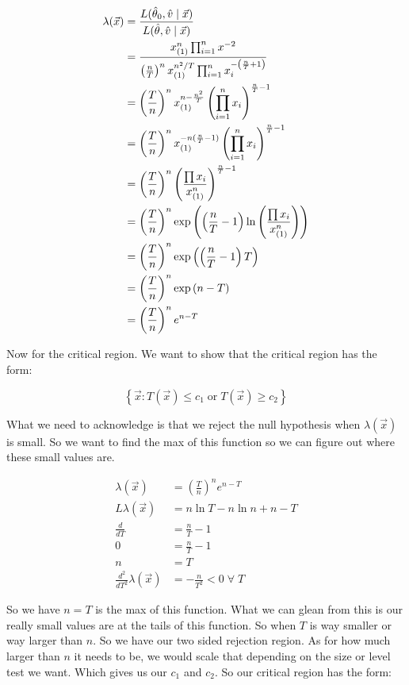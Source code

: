 \begin{align*}
	\lambda(\vec{x}) &= \frac{L(\hat{\theta}_0, \hat{v} \mid \vec{x})}{L(\hat{\theta}, \hat{v} \mid \vec{x})} \\
	&= \frac{x_{(1)}^n \prod_{i=1}^n x^{-2}}
	{\left( \frac{n}{T} \right)^n x_{(1)}^{n^2/T} \prod_{i=1}^n x_i^{-\left( \frac{n}{T} + 1 \right)}} \\
	&= \left( \frac{T}{n} \right)^n x_{(1)}^{n - \frac{n^2}{T}} \left( \prod_{i=1}^n x_i \right)^{\frac{n}{T} - 1} \\
	&= \left( \frac{T}{n} \right)^n x_{(1)}^{-n(\frac{n}{T} - 1)} \left( \prod_{i=1}^n x_i \right)^{\frac{n}{T} - 1} \\
	&= \left( \frac{T}{n} \right)^n \left(  \frac{\prod x_i}{x_{(1)}^n} \right)^{\frac{n}{T} - 1} \\
	&= \left( \frac{T}{n} \right)^n \exp\left( \left( \frac{n}{T} - 1 \right) \ln \left(  \frac{\prod x_i}{x_{(1)}^n} \right) \right) \\
	&= \left( \frac{T}{n} \right)^n  \exp\left( \left( \frac{n}{T} - 1 \right) T\right) \\
	&= \left( \frac{T}{n} \right)^n  \exp\left( n - T \right) \\
	&= \left( \frac{T}{n} \right)^n e^{n - T}
\end{align*}

Now for the critical region. We want to show that the critical region has the form:

\[
	\left\{ \vec{x}: T(\vec{x}) \leq c_1 \; \text{or} \; T(\vec{x}) \geq c_2 \right\}
\]

What we need to acknowledge is that we reject the null hypothesis when $\lambda(\vec{x})$ is small. So we want to find the max of this function so we can figure out where these small values are.

\begin{align*}
	\lambda(\vec{x}) &= \left( \frac{T}{n} \right)^n e^{n - T} \\
	L\lambda(\vec{x}) &= n\ln T - n\ln n + n - T \\
	\frac{d}{dT} &= \frac{n}{T} - 1 \\
	0 &= \frac{n}{T} - 1 \\
	n &= T \\
	\frac{d^2}{dT^2} \lambda(\vec{x}) &= -\frac{n}{T^2} < 0 \; \forall \; T 
\end{align*}

So we have $n=T$ is the max of this function. What we can glean from this is our really small values are at the tails of this function. So when $T$ is way smaller or way larger than $n$. So we have our two sided rejection region. As for how much larger than $n$ it needs to be, we would scale that depending on the size or level test we want. Which gives us our $c_1$ and $c_2$. So our critical region has the form:

